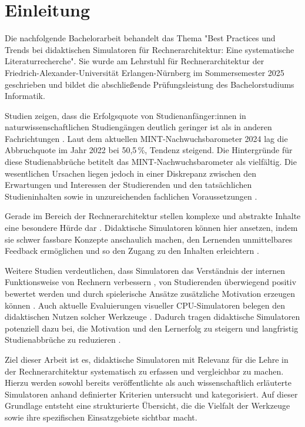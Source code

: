 \chapter{Einleitung}

Die nachfolgende Bachelorarbeit behandelt das Thema "Best Practices und Trends bei didaktischen Simulatoren für Rechnerarchitektur: Eine systematische Literaturrecherche". Sie wurde am Lehrstuhl für Rechnerarchitektur der Friedrich-Alexander-Universität Erlangen-Nürnberg im Sommersemester 2025 geschrieben und bildet die abschließende Prüfungsleistung des Bachelorstudiums Informatik.

Studien zeigen, dass die Erfolgsquote von Studienanfänger:innen in naturwissenschaftlichen Studiengängen deutlich geringer ist als in anderen Fachrichtungen \parencite[S.~370]{burdinski_lehrvideos_2024}. Laut dem aktuellen MINT-Nachwuchsbarometer 2024 lag die Abbruchquote im Jahr 2022 bei 50,5\,\%, Tendenz steigend. Die Hintergründe für diese Studienabbrüche betitelt das MINT-Nachwuchsbarometer als vielfältig. Die wesentlichen Ursachen liegen jedoch in einer Diskrepanz zwischen den Erwartungen und Interessen der Studierenden und den tatsächlichen Studieninhalten sowie in unzureichenden fachlichen Voraussetzungen \parencite[S.~21]{joachim_herz_stiftung_mint_2024}.

Gerade im Bereich der Rechnerarchitektur stellen komplexe und abstrakte Inhalte eine besondere Hürde dar \parencite[S.~1]{grober_championship_2022}. Didaktische Simulatoren können hier ansetzen, indem sie schwer fassbare Konzepte anschaulich machen, den Lernenden unmittelbares Feedback ermöglichen und so den Zugang zu den Inhalten erleichtern \parencite[S.~11]{zeichner_using_2020}. 

Weitere Studien verdeutlichen, dass Simulatoren das Verständnis der internen Funktionsweise von Rechnern verbessern \parencite[S.~215]{prasad_using_2015}, von Studierenden überwiegend positiv bewertet werden \parencite[S.~8]{besim_understanding_2012} und durch spielerische Ansätze zusätzliche Motivation erzeugen können \parencite[S.~453]{schlag_gamifizierung_2021}. Auch aktuelle Evaluierungen visueller CPU-Simulatoren belegen den didaktischen Nutzen solcher Werkzeuge \parencites[S.~11]{maxnuck_soares_use_2016}[S.~75]{cortinovis_further_2024}. Dadurch tragen didaktische Simulatoren potenziell dazu bei, die Motivation und den Lernerfolg zu steigern und langfristig Studienabbrüche zu reduzieren \parencite[S.~272]{kornelsen_expedition_2005}.

Ziel dieser Arbeit ist es, didaktische Simulatoren mit Relevanz für die Lehre in der Rechnerarchitektur systematisch zu erfassen und vergleichbar zu machen. Hierzu werden sowohl bereits veröffentlichte als auch wissenschaftlich erläuterte Simulatoren anhand definierter Kriterien untersucht und kategorisiert. Auf dieser Grundlage entsteht eine strukturierte Übersicht, die die Vielfalt der Werkzeuge sowie ihre spezifischen Einsatzgebiete sichtbar macht.

